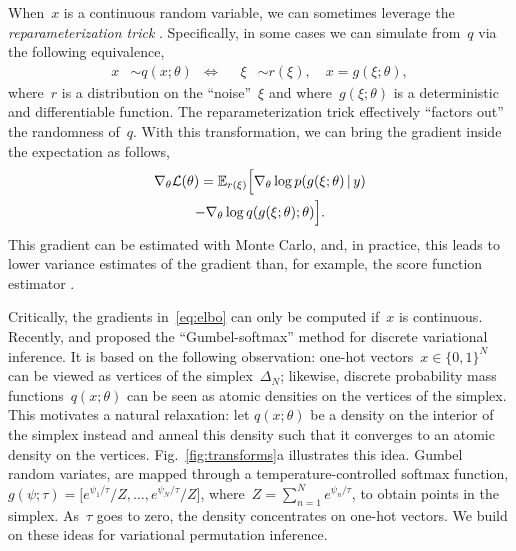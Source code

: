 \documentclass[twoside]{article}
\begin{document}
When~$x$ is a continuous random variable, we can sometimes leverage the \emph{reparameterization trick}
\citep{Salimans2013, Kingma2014}.  Specifically, in some cases we can
simulate from~$q$ via the following equivalence,
\begin{align*}
  x &\sim q(x; \theta)
      & \iff & &  
  \xi &\sim r(\xi), \quad x = g(\xi;\theta),
\end{align*}
where~$r$ is a distribution on the ``noise''~$\xi$ and
where~$g(\xi; \theta)$ is a deterministic and differentiable
function.
The reparameterization trick effectively ``factors out'' the randomness
of~$q$. With this transformation, we can bring the gradient inside the
expectation as follows,
\begin{multline}
  \label{eq:elbo}
  \nabla_\theta \mathcal{L}(\theta) 
  = \mathbb{E}_{r(\xi)} \Big[ \nabla_\theta \log p(g(\xi; \theta) \, | \, y) \\
    - \nabla_\theta  \log q(g(\xi; \theta); \theta) \Big].
\end{multline}
This gradient can be estimated with Monte Carlo, and, in practice,
this leads to lower variance estimates of the gradient than, for
example, the score function estimator \citep{Williams1992, Glynn1990}.

Critically, the gradients in~\eqref{eq:elbo} can only be computed
if~$x$ is continuous. Recently, \citet{maddison2016concrete} and
\citet{jang2016categorical} proposed the ``Gumbel-softmax'' method for
discrete variational inference. It is based on the following
observation: one-hot vectors~${x \in \{0,1\}^N}$ can be viewed as
vertices of the simplex~$\Delta_N$; likewise, discrete probability
mass functions~$q(x; \theta)$ can be seen as atomic densities on the
vertices of the simplex.  This motivates a natural relaxation: let
$q(x; \theta)$ be a density on the interior of the simplex instead and
anneal this density such that it converges to an atomic density on the
vertices. Fig.~\ref{fig:transforms}a illustrates this idea. Gumbel
random variates, are mapped through a temperature-controlled softmax
function,
${g(\psi; \tau) = \big[e^{\psi_1 / \tau}/Z, \ldots, e^{\psi_N /
    \tau}/Z \big]}$, where~$Z=\sum_{n=1}^N e^{\psi_n / \tau}$, to
obtain points in the simplex. As~$\tau$ goes to zero, the density
concentrates on one-hot vectors.  We build on these ideas
for variational permutation inference.
\end{document}
